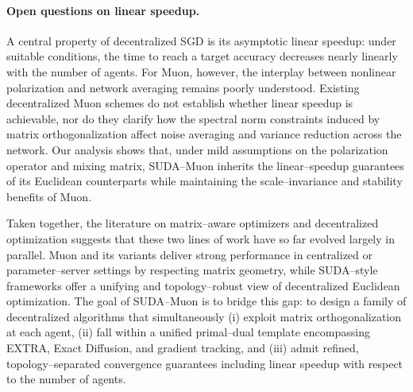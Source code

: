 \paragraph{Open questions on linear speedup.}
A central property of decentralized SGD is its asymptotic linear speedup: under suitable conditions, the time to reach a target accuracy decreases nearly linearly with the number of agents. For Muon, however, the interplay between nonlinear polarization and network averaging remains poorly understood. Existing decentralized Muon schemes do not establish whether linear speedup is achievable, nor do they clarify how the spectral norm constraints induced by matrix orthogonalization affect noise averaging and variance reduction across the network. Our analysis shows that, under mild assumptions on the polarization operator and mixing matrix, SUDA–Muon inherits the linear–speedup guarantees of its Euclidean counterparts while maintaining the scale–invariance and stability benefits of Muon.

Taken together, the literature on matrix–aware optimizers and decentralized optimization suggests that these two lines of work have so far evolved largely in parallel. Muon and its variants deliver strong performance in centralized or parameter–server settings by respecting matrix geometry, while SUDA–style frameworks offer a unifying and topology–robust view of decentralized Euclidean optimization. The goal of SUDA–Muon is to bridge this gap: to design a family of decentralized algorithms that simultaneously (i) exploit matrix orthogonalization at each agent, (ii) fall within a unified primal–dual template encompassing EXTRA, Exact Diffusion, and gradient tracking, and (iii) admit refined, topology–separated convergence guarantees including linear speedup with respect to the number of agents.
